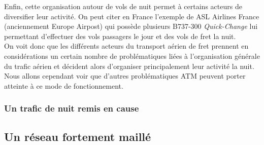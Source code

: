 Enfin, cette organisation autour de vols de nuit permet à certains acteurs de diversifier leur activité. On peut citer en France l'exemple de ASL Airlines France (anciennement Europe Airpost) qui possède plusieurs B737-300 \textit{Quick-Change} lui permettant d'effectuer des vols passagers le jour et des vols de fret la nuit.\\

On voit donc que les différents acteurs du transport aérien de fret prennent en considérations un certain nombre de problématiques liées à l'organisation générale du trafic aérien et décident alors d'organiser principalement leur activité la nuit. Nous allons cependant voir que d'autres problématiques ATM peuvent porter atteinte à ce mode de fonctionnement.

\subsubsection{Un trafic de nuit remis en cause}

\subsection{Un réseau fortement maillé}

